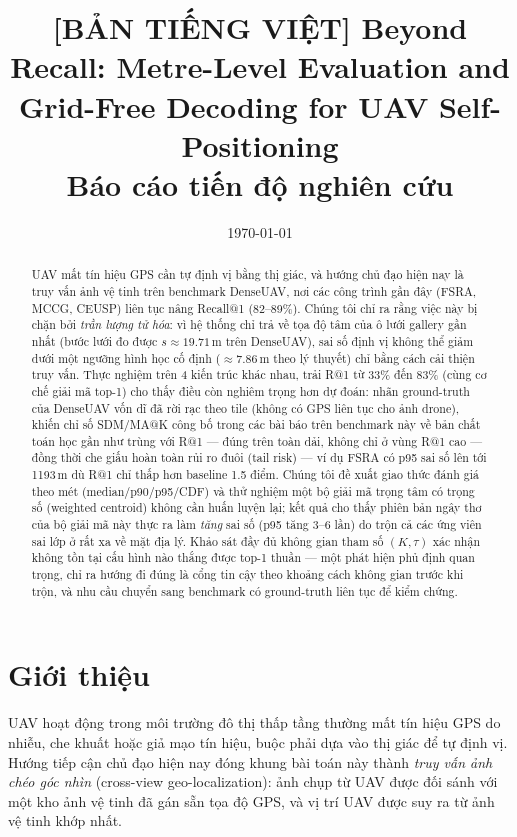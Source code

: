 \documentclass[11pt]{article}
\title{\textbf{[BẢN TIẾNG VIỆT] Beyond Recall: Metre-Level Evaluation and\\ Grid-Free Decoding for UAV Self-Positioning}\\[0.3em]
\large Báo cáo tiến độ nghiên cứu}
\author{}
\date{\today}
\begin{document}
\maketitle

\begin{abstract}
UAV mất tín hiệu GPS cần tự định vị bằng thị giác, và hướng chủ đạo hiện nay là truy vấn ảnh vệ tinh trên benchmark DenseUAV, nơi các công trình gần đây (FSRA, MCCG, CEUSP) liên tục nâng Recall@1 (82--89\%). Chúng tôi chỉ ra rằng việc này bị chặn bởi \emph{trần lượng tử hóa}: vì hệ thống chỉ trả về tọa độ tâm của ô lưới gallery gần nhất (bước lưới đo được $s\approx19.71$\,m trên DenseUAV), sai số định vị không thể giảm dưới một ngưỡng hình học cố định ($\approx$7.86\,m theo lý thuyết) chỉ bằng cách cải thiện truy vấn. Thực nghiệm trên 4 kiến trúc khác nhau, trải R@1 từ 33\% đến 83\% (cùng cơ chế giải mã top-1) cho thấy điều còn nghiêm trọng hơn dự đoán: nhãn ground-truth của DenseUAV vốn dĩ đã rời rạc theo tile (không có GPS liên tục cho ảnh drone), khiến chỉ số SDM/MA@K công bố trong các bài báo trên benchmark này về bản chất toán học gần như trùng với R@1 — đúng trên toàn dải, không chỉ ở vùng R@1 cao — đồng thời che giấu hoàn toàn rủi ro đuôi (tail risk) — ví dụ FSRA có p95 sai số lên tới 1193\,m dù R@1 chỉ thấp hơn baseline 1.5 điểm. Chúng tôi đề xuất giao thức đánh giá theo mét (median/p90/p95/CDF) và thử nghiệm một bộ giải mã trọng tâm có trọng số (weighted centroid) không cần huấn luyện lại; kết quả cho thấy phiên bản ngây thơ của bộ giải mã này thực ra làm \emph{tăng} sai số (p95 tăng 3--6 lần) do trộn cả các ứng viên sai lớp ở rất xa về mặt địa lý. Khảo sát đầy đủ không gian tham số $(K, \tau)$ xác nhận không tồn tại cấu hình nào thắng được top-1 thuần — một phát hiện phủ định quan trọng, chỉ ra hướng đi đúng là cổng tin cậy theo khoảng cách không gian trước khi trộn, và nhu cầu chuyển sang benchmark có ground-truth liên tục để kiểm chứng.
\end{abstract}

\section{Giới thiệu}

UAV hoạt động trong môi trường đô thị thấp tầng thường mất tín hiệu GPS do nhiễu, che khuất hoặc giả mạo tín hiệu, buộc phải dựa vào thị giác để tự định vị. Hướng tiếp cận chủ đạo hiện nay đóng khung bài toán này thành \emph{truy vấn ảnh chéo góc nhìn} (cross-view geo-localization): ảnh chụp từ UAV được đối sánh với một kho ảnh vệ tinh đã gán sẵn tọa độ GPS, và vị trí UAV được suy ra từ ảnh vệ tinh khớp nhất.
\end{document}
